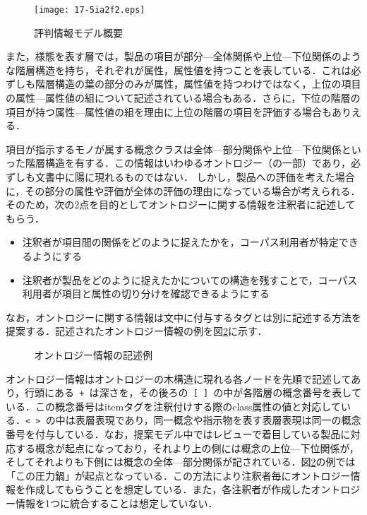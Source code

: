 \documentclass[japanese]{jnlp_1.4}
\begin{document}
\begin{figure}[t]
\texttt{[image: 17-5ia2f2.eps]}
\caption{評判情報モデル概要}
\label{fig:評判情報モデル概要}
\end{figure}

また，様態を表す層では，製品の項目が部分—全体関係や上位—下位関係のような階層構造を持ち，それぞれが属性，属性値を持つことを表している．これは必ずしも階層構造の葉の部分のみが属性，属性値を持つわけではなく，上位の項目の属性—属性値の組について記述されている場合もある．さらに，下位の階層の項目が持つ属性—属性値の組を理由に上位の階層の項目を評価する場合もありえる．

項目が指示するモノが属する概念クラスは全体—部分関係や上位—下位関係といった階層構造を有する．この情報はいわゆるオントロジー（の一部）であり，必ずしも文書中に陽に現れるものではない．
しかし，製品への評価を考えた場合に，その部分の属性や評価が全体の評価の理由になっている場合が考えられる．
そのため，次の2点を目的としてオントロジーに関する情報を注釈者に記述してもらう．

\begin{itemize}
\item
注釈者が項目間の関係をどのように捉えたかを，コーパス利用者が特定できるようにする
\item
注釈者が製品をどのように捉えたかについての構造を残すことで，コーパス利用者が項目と属性の切り分けを確認できるようにする
\end{itemize}

なお，オントロジーに関する情報は文中に付与するタグとは別に記述する方法を提案する．記述されたオントロジー情報の例を図\ref{fig:オントロジー情報の記述例}に示す．

\begin{figure}[t]

\caption{オントロジー情報の記述例}
\label{fig:オントロジー情報の記述例}
\end{figure}

オントロジー情報はオントロジーの木構造に現れる各ノードを先順で記述してあり，行頭にある\verb| + |は深さを，その後ろの\verb| [ ] |の中が各階層の概念番号を表している．この概念番号はitemタグを注釈付けする際のclass属性の値と対応している．\verb|< > |の中は表層表現であり，同一概念や指示物を表す表層表現は同一の概念番号を付与している．なお，提案モデル中ではレビューで着目している製品に対応する概念が起点になっており，それより上の側には概念の上位—下位関係が，そしてそれよりも下側には概念の全体—部分関係が記されている．図\ref{fig:オントロジー情報の記述例}の例では「この圧力鍋」が起点となっている．この方法により注釈者毎にオントロジー情報を作成してもらうことを想定している．また，各注釈者が作成したオントロジー情報を1つに統合することは想定していない．
\end{document}
